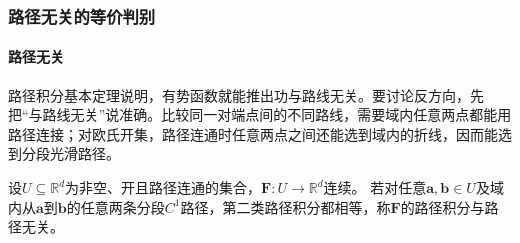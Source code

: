 \subsubsection{路径无关的等价判别}

\paragraph{路径无关}

路径积分基本定理说明，有势函数就能推出功与路线无关。要讨论反方向，先把“与路线无关”说准确。比较同一对端点间的不同路线，需要域内任意两点都能用路径连接；对欧氏开集，路径连通时任意两点之间还能选到域内的折线，因而能选到分段光滑路径。
\begin{definition}[路径无关]
设$U\subseteq\mathbb R^d$为非空、开且路径连通的集合，$\bm F:U\to\mathbb R^d$连续。
若对任意$\bm a,\bm b\in U$及域内从$\bm a$到$\bm b$的任意两条分段$C^1$路径，第二类路径积分都相等，称$\bm F$的路径积分与路径无关。
\end{definition}

